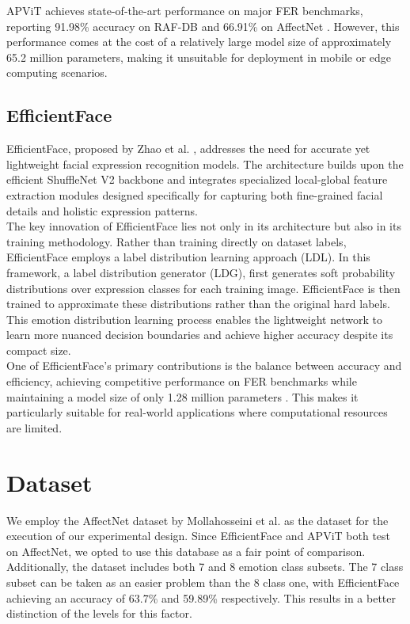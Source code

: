 APViT achieves state-of-the-art performance on major FER benchmarks, reporting 91.98\% accuracy on RAF-DB and 66.91\% on AffectNet \cite{apvit2023}. However, this performance comes at the cost of a relatively large model size of approximately 65.2 million parameters, making it unsuitable for deployment in mobile or edge computing scenarios.

\subsection{EfficientFace}

EfficientFace, proposed by Zhao et al. \cite{eff-face2021}, addresses the need for accurate yet lightweight facial expression recognition models. The architecture builds upon the efficient ShuffleNet V2 backbone and integrates specialized local-global feature extraction modules designed specifically for capturing both fine-grained facial details and holistic expression patterns.\\

The key innovation of EfficientFace lies not only in its architecture but also in its training methodology. Rather than training directly on dataset labels, EfficientFace employs a label distribution learning approach (LDL). In this framework, a label distribution generator (LDG), first generates soft probability distributions over expression classes for each training image. EfficientFace is then trained to approximate these distributions rather than the original hard labels. This emotion distribution learning process enables the lightweight network to learn more nuanced decision boundaries and achieve higher accuracy despite its compact size.\\

One of EfficientFace's primary contributions is the balance between accuracy and efficiency, achieving competitive performance on FER benchmarks while maintaining a model size of only 1.28 million parameters \cite{eff-face2021}. This makes it particularly suitable for real-world applications where computational resources are limited.

\section{Dataset}

We employ the AffectNet dataset by Mollahosseini et al. \cite{affnet2019} as the dataset for the execution of our experimental design. Since EfficientFace \cite{eff-face2021} and APViT \cite{apvit2023} both test on AffectNet, we opted to use this database as a fair point of comparison. Additionally, the dataset includes both 7 and 8 emotion class subsets. The 7 class subset can be taken as an easier problem than the 8 class one, with EfficientFace achieving an accuracy of 63.7\% and 59.89\% respectively. This results in a better distinction of the levels for this factor.\\

